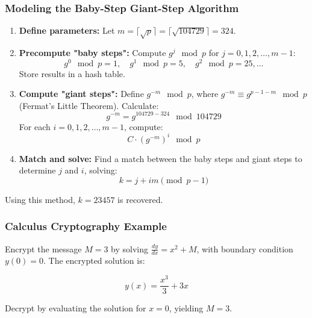 \documentclass[12pt]{article}
\begin{document}
\subsubsection*{Modeling the Baby-Step Giant-Step Algorithm}
\begin{enumerate}
    \item \textbf{Define parameters:} Let \( m = \lceil \sqrt{p} \rceil = \lceil \sqrt{104729} \rceil = 324 \).

    \item \textbf{Precompute "baby steps":} Compute \( g^j \mod p \) for \( j = 0, 1, 2, \ldots, m - 1 \):
    \[
    g^0 \mod p = 1, \quad g^1 \mod p = 5, \quad g^2 \mod p = 25, \ldots
    \]
    Store results in a hash table.

    \item \textbf{Compute "giant steps":} Define \( g^{-m} \mod p \), where \( g^{-m} \equiv g^{p-1-m} \mod p \) (Fermat's Little Theorem). Calculate:
    \[
    g^{-m} = g^{104729 - 324} \mod 104729
    \]
    For each \( i = 0, 1, 2, \ldots, m - 1 \), compute:
    \[
    C \cdot (g^{-m})^i \mod p
    \]

    \item \textbf{Match and solve:} Find a match between the baby steps and giant steps to determine \( j \) and \( i \), solving:
    \[
    k = j + im \pmod{p-1}
    \]
\end{enumerate}

Using this method, \( k = 23457 \) is recovered.


\subsubsection*{Calculus Cryptography Example}
Encrypt the message \( M = 3 \) by solving \( \frac{dy}{dx} = x^2 + M \), with boundary condition \( y(0) = 0 \). The encrypted solution is:

\[
y(x) = \frac{x^3}{3} + 3x
\]

Decrypt by evaluating the solution for \( x = 0 \), yielding \( M = 3 \).
\end{document}
